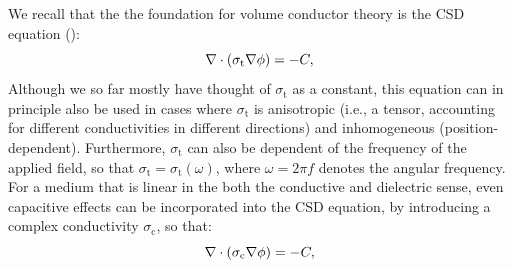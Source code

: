 \subsection{}
\label{sec:Sigma:Complex}
We recall that the the foundation for volume conductor theory is the CSD equation ():
\begin{equation}
{\bf \nabla} \cdot \left(\sigma_\text{t} {\bf \nabla} {\phi} \right) = -C,
\label{eq:Sigma:CSDrepeated}
\end{equation}
Although we so far mostly have thought of $\sigma_\text{t}$ as a constant, this equation can in principle also be used in cases where $\sigma_\text{t}$ is anisotropic (i.e., a tensor, accounting for different conductivities in different directions) and inhomogeneous (position-dependent). Furthermore, $\sigma_\text{t}$ can also be dependent of the frequency of the applied field, so that $\sigma_\text{t} =\sigma_\text{t}(\omega)$, where $\omega = 2 \pi f$ denotes the angular frequency. For a medium that is linear in the both the conductive and dielectric sense, even capacitive effects can be incorporated into the CSD equation, 
by introducing a complex conductivity $\sigma_\text{c}$, so that:
\begin{equation}
{\bf \nabla} \cdot \left(\sigma_\text{c} {\bf \nabla} {\phi} \right) = -C,
\label{eq:Sigma:compexCSD}
\end{equation}

